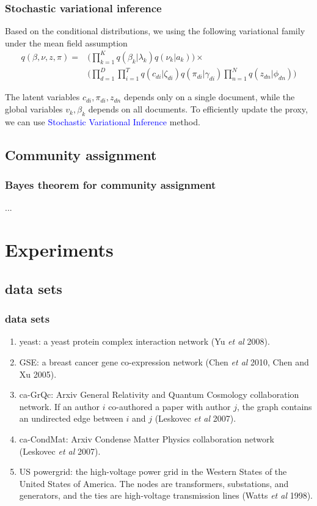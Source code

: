 \documentclass{beamer}
\begin{document}
\begin{frame}
\frametitle{Stochastic variational inference}
Based on the conditional distributions, we using the following variational family under the mean field assumption
\begin{align*}
q(\beta,\nu,z,\pi)  = & \Big(\prod_{k=1}^{K}q(\beta_k|\lambda_k)q(\nu_k|a_k)\Big)\times\\
&\Big(\prod_{d=1}^{D}\prod_{i=1}^{T}q(c_{di}|\zeta_{di})q(\pi_{di}|\gamma_{di})\prod_{n=1}^{N}q(z_{dn}|\phi_{dn})\Big)
\end{align*}

The latent variables $c_{di}, \pi_{di}, z_{dn}$ depends only on a single document, while the global variables $v_k, \beta_k$ depends on all documents. To efficiently update the proxy, we can use \textcolor{blue}{Stochastic Variational Inference} method.
\end{frame}

\subsection{Community assignment}
\begin{frame}
\frametitle{Bayes theorem for community assignment}
...
\end{frame}

\section{Experiments}
\subsection{data sets}
\begin{frame}
\frametitle{data sets}
\begin{enumerate}
	\item yeast: a yeast protein complex interaction network (Yu \textit{et al} 2008).
	\item GSE: a breast cancer gene co-expression network (Chen \textit{et al} 2010, Chen and Xu 2005).
	\item ca-GrQc: Arxiv General Relativity and Quantum Cosmology collaboration network. If an author $i$ co-authored a paper with author $j$, the graph contains an undirected edge between $i$ and $j$ (Leskovec \textit{et al} 2007).
	\item ca-CondMat: Arxiv Condense Matter Physics collaboration network (Leskovec \textit{et al} 2007).
	\item US powergrid: the high-voltage power grid in the Western States of the United States of America. The nodes are transformers, substations, and generators, and the ties are high-voltage transmission lines (Watts \textit{et al} 1998).
\end{enumerate}
\end{frame}
\end{document}
